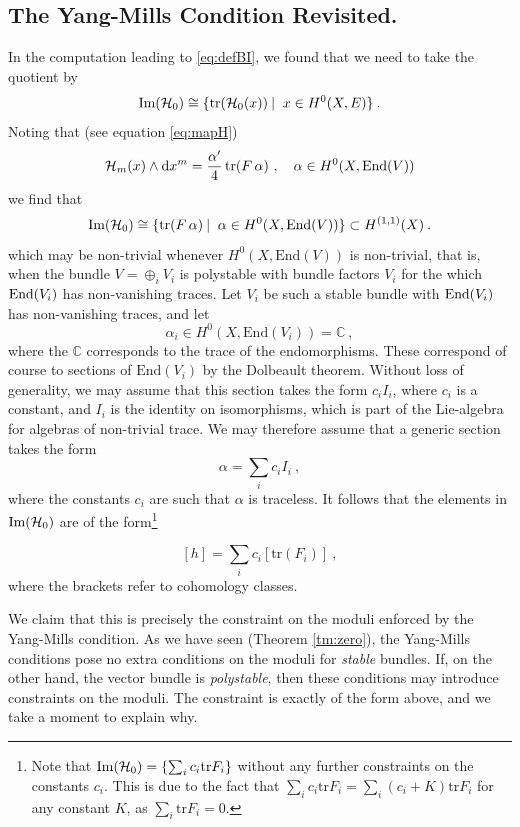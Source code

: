 \documentclass[12pt,a4paper]{article}
\def\d{\textrm{d}}
\def\End{\textrm{End}}
\def\tr{\textrm{tr}}
\theoremstyle{definition}
\begin{document}
\subsection{The Yang-Mills Condition Revisited.}
In the computation leading to  \eqref{eq:defBI}, we found that we need to take the quotient by 
\begin{equation*}
\textrm{Im}({\cal H}_0)\cong\{\tr({\cal H}_0({x}))\:\vert\:\ x\in H^0(X,E)\}\:.
\end{equation*}
Noting that (see equation \eqref{eq:mapH})
\[ {\cal H}_m(x)\wedge\d x^m = \frac{\alpha'}{4}\, \tr(F\,\alpha)~,\quad \alpha\in H^0(X,\End(V))\]
we find that
\[ \textrm{Im}({\cal H}_0)\cong\{\tr(F\, \alpha)\:\vert\:\ \alpha\in H^0(X,\End(V))\}\subset H^{(1,1)}(X)\:.\]
which may be non-trivial whenever $H^0(X,\End(V))$ is non-trivial, that is, when the bundle $V=\oplus_iV_i$ is polystable with bundle factors $V_i$ for the which ${\rm End}(V_i)$ has non-vanishing traces. 
Let $V_i$ be such a stable bundle with ${\rm End}(V_i)$ has non-vanishing traces, and let
\begin{equation*}
\alpha_i\in H^0(X,\End(V_i))=\mathbb{C}\:,
\end{equation*}
where the $\mathbb{C}$ corresponds to the trace of the endomorphisms. These correspond of course to sections of $\End(V_i)$ by the Dolbeault theorem. Without loss of generality, we may assume that this section takes the form $c_i I_i$, where $c_i$ is a constant, and $I_i$ is the identity on isomorphisms, which is part of the Lie-algebra for algebras of non-trivial trace. We may therefore assume that a generic section takes the form
\begin{equation}
\alpha=\sum_i c_i I_i\:,\label{eq:gensec}
\end{equation}
where the constants  $c_i$ are such that $\alpha$ is traceless. It follows that the elements in $\textrm{Im}({\cal H}_0)$ are of the form\footnote{
Note that ${\rm Im}({\cal H}_0)=\{\sum_ic_i\tr F_i\}$ without any further constraints on the constants $c_i$. This is due to the fact that 
$\sum_ic_i\tr F_i = \sum_i(c_i+K)\tr F_i$  for any constant $K$, as  $\sum_i\tr F_i = 0$.}

\begin{equation*}
\label{eq:Dtermcond}
[h]=\sum_i c_i[\tr(F_i)]\:,
\end{equation*}
where the brackets refer to cohomology classes. 

We claim that this is precisely the constraint on the moduli enforced by the Yang-Mills condition. As we have seen (Theorem \ref{tm:zero}), the Yang-Mills conditions pose no extra conditions on the moduli for {\it stable} bundles. If, on the other hand, the vector bundle is {\it polystable}, then these conditions may introduce constraints on the moduli. The constraint is exactly of the form above, and we take a moment to explain why.
\end{document}
